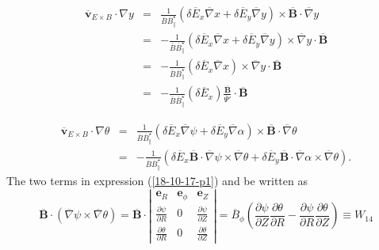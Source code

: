 \documentclass{article}
\begin{document}
\begin{eqnarray}
  \overline{\mathbf{v}}_{E \times B} \cdot \nabla y & = &
  \frac{1}{\overline{B}  \overline{B}^{\star}_{\parallel}} (\delta
  \overline{E}_x \overline{\nabla} x + \delta \overline{E}_y \overline{\nabla}
  y) \times \overline{\mathbf{B}} \cdot \overline{\nabla} y \nonumber\\
  & = & - \frac{1}{\overline{B}  \overline{B}^{\star}_{\parallel}} (\delta
  \overline{E}_x \overline{\nabla} x + \delta \overline{E}_y \overline{\nabla}
  y) \times \overline{\nabla} y \cdot \overline{\mathbf{B}} \nonumber\\
  & = & - \frac{1}{\overline{B}  \overline{B}^{\star}_{\parallel}} (\delta
  \overline{E}_x \overline{\nabla} x) \times \overline{\nabla} y \cdot
  \overline{\mathbf{B}} \nonumber\\
  & = & - \frac{1}{\overline{B}  \overline{B}^{\star}_{\parallel}} (\delta
  \overline{E}_x) \frac{\overline{\mathbf{B}}}{\overline{\Psi}'} \cdot
  \overline{\mathbf{B}} 
\end{eqnarray}

\begin{eqnarray}
  \overline{\mathbf{v}}_{E \times B} \cdot \nabla \theta & = &
  \frac{1}{\overline{B}  \overline{B}^{\star}_{\parallel}} (\delta
  \overline{E}_x \overline{\nabla} \psi + \delta \overline{E}_y
  \overline{\nabla} \alpha) \times \overline{\mathbf{B}} \cdot
  \overline{\nabla} \theta \nonumber\\
  & = & - \frac{1}{\overline{B}  \overline{B}^{\star}_{\parallel}} (\delta
  \overline{E}_x \overline{\mathbf{B}} \cdot \overline{\nabla} \psi \times
  \overline{\nabla} \theta + \delta \overline{E}_y \overline{\mathbf{B}} \cdot
  \overline{\nabla} \alpha \times \overline{\nabla} \theta) . 
  \label{18-10-17-p1}
\end{eqnarray}
The two terms in expression (\ref{18-10-17-p1}) and be written as
\begin{equation}
  \overline{\mathbf{B}} \cdot (\overline{\nabla} \psi \times \overline{\nabla}
  \theta) = \overline{\mathbf{B}} \cdot \left|\begin{array}{ccc}
    \mathbf{e}_R & \mathbf{e}_{\phi} & \mathbf{e}_Z\\
    \frac{\partial \psi}{\partial R} & 0 & \frac{\partial \psi}{\partial Z}\\
    \frac{\partial \theta}{\partial R} & 0 & \frac{\partial \theta}{\partial
    Z}
  \end{array}\right| = \overline{B}_{\phi} \left( \frac{\partial
  \psi}{\partial Z}  \frac{\partial \theta}{\partial R} - \frac{\partial
  \psi}{\partial R}  \frac{\partial \theta}{\partial Z} \right) \equiv W_{14}
\end{equation}
\end{document}
